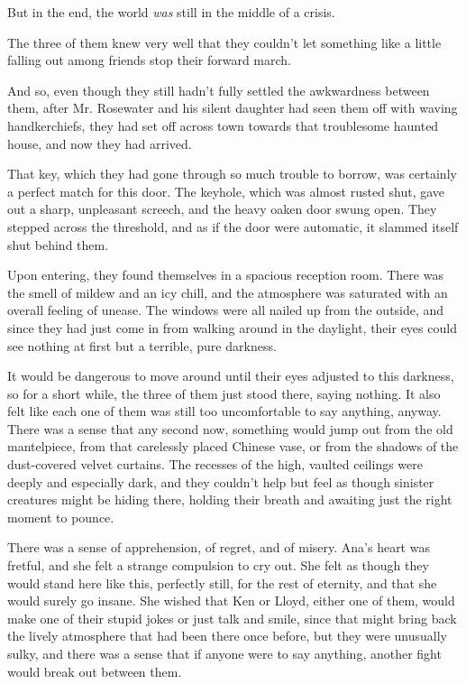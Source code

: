 \documentclass[
]{article}
\begin{document}
But in the end, the world \emph{was} still in the middle of a crisis.

The three of them knew very well that they couldn't let something like a
little falling out among friends stop their forward march.

And so, even though they still hadn't fully settled the awkwardness
between them, after Mr. Rosewater and his silent daughter had seen them
off with waving handkerchiefs, they had set off across town towards that
troublesome haunted house, and now they had arrived.

That key, which they had gone through so much trouble to borrow, was
certainly a perfect match for this door. The keyhole, which was almost
rusted shut, gave out a sharp, unpleasant screech, and the heavy oaken
door swung open. They stepped across the threshold, and as if the door
were automatic, it slammed itself shut behind them.

Upon entering, they found themselves in a spacious reception room. There
was the smell of mildew and an icy chill, and the atmosphere was
saturated with an overall feeling of unease. The windows were all nailed
up from the outside, and since they had just come in from walking around
in the daylight, their eyes could see nothing at first but a terrible,
pure darkness.

It would be dangerous to move around until their eyes adjusted to this
darkness, so for a short while, the three of them just stood there,
saying nothing. It also felt like each one of them was still too
uncomfortable to say anything, anyway. There was a sense that any second
now, something would jump out from the old mantelpiece, from that
carelessly placed Chinese vase, or from the shadows of the dust-covered
velvet curtains. The recesses of the high, vaulted ceilings were deeply
and especially dark, and they couldn't help but feel as though sinister
creatures might be hiding there, holding their breath and awaiting just
the right moment to pounce.

There was a sense of apprehension, of regret, and of misery. Ana's heart
was fretful, and she felt a strange compulsion to cry out. She felt as
though they would stand here like this, perfectly still, for the rest of
eternity, and that she would surely go insane. She wished that Ken or
Lloyd, either one of them, would make one of their stupid jokes or just
talk and smile, since that might bring back the lively atmosphere that
had been there once before, but they were unusually sulky, and there was
a sense that if anyone were to say anything, another fight would break
out between them.
\end{document}
